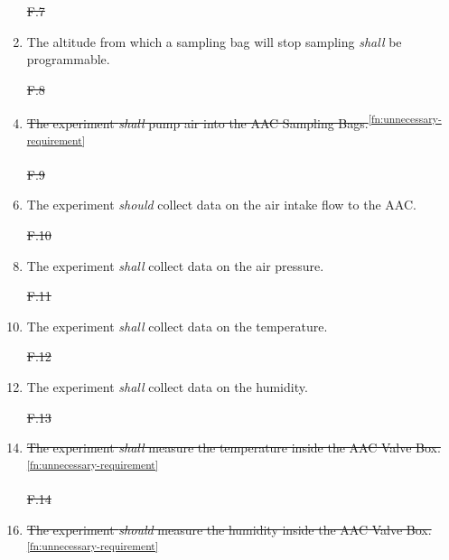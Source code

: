 \documentclass[a4paper,12pt,twoside]{article}
\providecommand{\DIFdeltex}[1]{{\protect\color{red}\sout{#1}}}                      %
\providecommand{\DIFaddbegin}{} %
\providecommand{\DIFaddend}{} %
\providecommand{\DIFdelbegin}{} %
\providecommand{\DIFdelend}{} %
\providecommand{\DIFdel}[1]{\texorpdfstring{\DIFdeltex{#1}}{}} %
\newcommand{\DIFscaledelfig}{0.5}
\newlength{\DIFdelgraphicswidth} %
\newlength{\DIFdelgraphicsheight} %
\newcommand{\DIFaddincludegraphics}[2][]{{\color{blue}\fbox{\DIFOincludegraphics[#1]{#2}}}} %
\newcommand{\DIFdelincludegraphics}[2][]{%
\sbox{\DIFdelgraphicsbox}{\DIFOincludegraphics[#1]{#2}}%
\settoboxwidth{\DIFdelgraphicswidth}{\DIFdelgraphicsbox} %
\settoboxtotalheight{\DIFdelgraphicsheight}{\DIFdelgraphicsbox} %
\scalebox{\DIFscaledelfig}{%
\parbox[b]{\DIFdelgraphicswidth}{\usebox{\DIFdelgraphicsbox}\\[-\baselineskip] \rule{\DIFdelgraphicswidth}{0em}}\llap{\resizebox{\DIFdelgraphicswidth}{\DIFdelgraphicsheight}{%
\setlength{\unitlength}{\DIFdelgraphicswidth}%
\begin{picture}(1,1)%
\thicklines\linethickness{2pt} %
{\color[rgb]{1,0,0}\put(0,0){\framebox(1,1){}}}%
{\color[rgb]{1,0,0}\put(0,0){\line( 1,1){1}}}%
{\color[rgb]{1,0,0}\put(0,1){\line(1,-1){1}}}%
\end{picture}%
}\hspace*{3pt}}} %
} %
\DeclareRobustCommand{\DIFaddbegin}{\DIFOaddbegin \let\includegraphics\DIFaddincludegraphics} %
\DeclareRobustCommand{\DIFaddend}{\DIFOaddend \let\includegraphics\DIFOincludegraphics} %
\DeclareRobustCommand{\DIFdelbegin}{\DIFOdelbegin \let\includegraphics\DIFdelincludegraphics} %
\DeclareRobustCommand{\DIFdelend}{\DIFOaddend \let\includegraphics\DIFOincludegraphics} %
\begin{document}
\begin{enumerate}[label=F.\arabic*]
    \DIFdelbegin %
\item[\DIFdel{F.7}]%
\DIFdelend \DIFaddbegin \item \DIFaddend The altitude from which a sampling bag will stop sampling \textit{shall} be programmable.
    \DIFdelbegin %
\item[\DIFdel{F.8}]%
\DIFdelend \DIFaddbegin \item \DIFaddend \st{The experiment \textit{shall} pump air into the AAC Sampling Bags.}\textsuperscript{\ref{fn:unnecessary-requirement}}
    \DIFdelbegin %
\item[\DIFdel{F.9}]%
\DIFdelend \DIFaddbegin \item \DIFaddend The experiment \textit{should} collect data on the air intake flow to the AAC.
    \DIFdelbegin %
\item[\DIFdel{F.10}]%
\DIFdelend \DIFaddbegin \item \DIFaddend The experiment \textit{shall} collect data on the air pressure.
    \DIFdelbegin %
\item[\DIFdel{F.11}]%
\DIFdelend \DIFaddbegin \item \DIFaddend The experiment \textit{shall} collect data on the temperature.
    \DIFdelbegin %
\item[\DIFdel{F.12}]%
\DIFdelend \DIFaddbegin \item \DIFaddend The experiment \textit{shall} collect data on the humidity.
    \DIFdelbegin %
\item[\DIFdel{F.13}]%
\DIFdelend \DIFaddbegin \item \DIFaddend \st{The experiment \textit{shall} measure the temperature inside the AAC Valve Box.}\textsuperscript{\ref{fn:unnecessary-requirement}}
    \DIFdelbegin %
\item[\DIFdel{F.14}]%
\DIFdelend \DIFaddbegin \item \DIFaddend \st{The experiment \textit{should} measure the humidity inside the AAC Valve Box.}\textsuperscript{\ref{fn:unnecessary-requirement}}

\end{enumerate}
\end{document}
